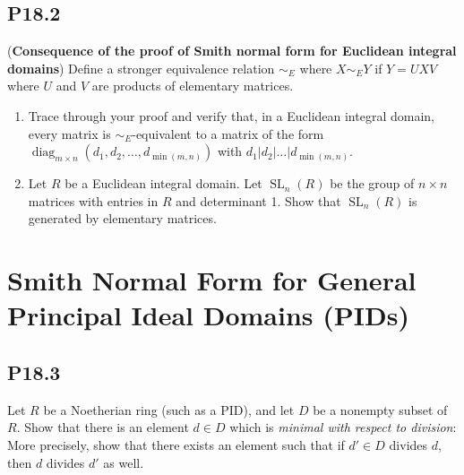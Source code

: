 \documentclass[lang=cn,11pt]{template}
\begin{document}
\subsection*{P18.2} (\textbf{Consequence of the proof of Smith normal form for Euclidean integral domains}) Define a stronger equivalence relation \( \sim_E \) where \( X \sim_E Y \) if \( Y = UXV \) where \( U \) and \( V \) are products of elementary matrices.
\begin{enumerate}
    \item Trace through your proof and verify that, in a Euclidean integral domain, every matrix is \( \sim_E \)-equivalent to a matrix of the form \( \operatorname{diag}_{m \times n}(d_1, d_2, \dots, d_{\min(m,n)}) \) with \( d_1 | d_2 | \dots | d_{\min(m,n)} \).
    \item Let \( R \) be a Euclidean integral domain. Let \( \operatorname{SL}_n(R) \) be the group of \( n \times n \) matrices with entries in \( R \) and determinant 1. Show that \( \operatorname{SL}_n(R) \) is generated by elementary matrices.
\end{enumerate}

\section{Smith Normal Form for General Principal Ideal Domains (PIDs)}

\subsection*{P18.3} Let \( R \) be a Noetherian ring (such as a PID), and let \( D \) be a nonempty subset of \( R \). Show that there is an element \( d \in D \) which is \textit{minimal with respect to division}: More precisely, show that there exists an element such that if \( d' \in D \) divides \( d \), then \( d \) divides \( d' \) as well.
\end{document}
